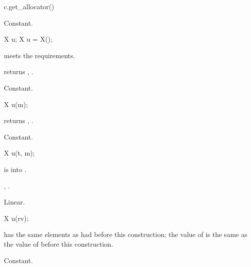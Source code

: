 %
\begin{itemdecl}
c.get_allocator()
\end{itemdecl}

\begin{itemdescr}
\pnum
\result
{}

\pnum
\complexity
Constant.
\end{itemdescr}

\begin{itemdecl}
X u;
X u = X();
\end{itemdecl}

\begin{itemdescr}
\pnum
\expects
{} meets the  requirements.

\pnum
\ensures
{} returns , .

\pnum
\complexity
Constant.
\end{itemdescr}

\begin{itemdecl}
X u(m);
\end{itemdecl}

\begin{itemdescr}
\pnum
\ensures
{} returns , .

\pnum
\complexity
Constant.
\end{itemdescr}

\begin{itemdecl}
X u(t, m);
\end{itemdecl}

\begin{itemdescr}
\pnum
\expects
{} is  into .

\pnum
\ensures
{}, .

\pnum
\complexity
Linear.
\end{itemdescr}

\begin{itemdecl}
X u(rv);
\end{itemdecl}

\begin{itemdescr}
\pnum
\ensures
{} has the same elements as  had before this construction;
the value of  is the same as
the value of  before this construction.

\pnum
\complexity
Constant.
\end{itemdescr}

